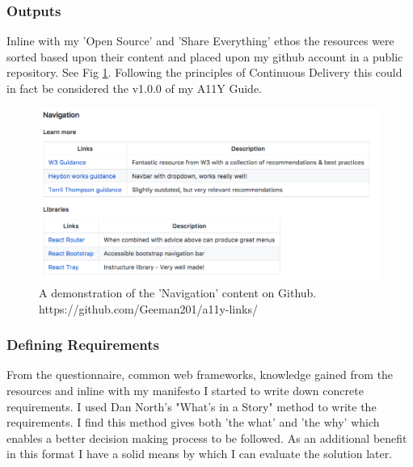 \subsubsection{Outputs}
Inline with my 'Open Source' and 'Share Everything' ethos the resources were
sorted based upon their content and placed upon my github account in a public
 repository.
See Fig \ref{fig:allyLinksDemo}.
Following the principles of Continuous Delivery this could in fact be
considered the v1.0.0 of my A11Y Guide.

\begin{figure}[H]
\centering
\includegraphics[width=\textwidth]{figures/documentation_link_example}
\captionsetup{justification=centering}
\caption{A demonstration of the 'Navigation' content on Github.
https://github.com/Geeman201/a11y-links/
\label{fig:allyLinksDemo}}
\end{figure}


\subsubsection{Defining Requirements}
From the questionnaire, common web frameworks, knowledge gained from the
resources and inline with my manifesto I started to write down concrete
requirements. I used Dan North's "What's in a Story" method to write the
requirements. I find this method gives both 'the what' and 'the why' which
enables a better decision making process to be followed. As an additional
benefit in this format I have a solid means by which I can evaluate the
solution later.


